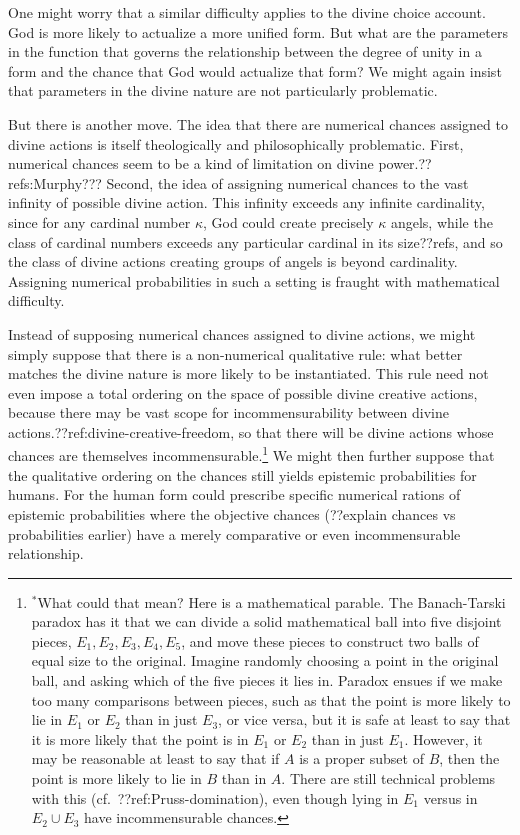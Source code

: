 One might worry that a similar difficulty applies to the divine choice account. God is more likely to actualize a more unified 
form. But what are the parameters in the function that governs the relationship between the degree of unity in a form and the chance that 
God would actualize that form? We might again insist that parameters in the divine nature are not particularly problematic.

But there is another move. The idea that there are numerical chances assigned to divine actions is itself theologically and philosophically
problematic. First, numerical chances seem to be a kind of limitation on divine power.??refs:Murphy??? Second, the idea of assigning 
numerical chances to the vast infinity of possible divine action. This infinity exceeds any infinite cardinality, since for any
cardinal number $\kappa$, God could create precisely $\kappa$ angels, while the class of cardinal numbers exceeds any particular cardinal 
in its size??refs, and so the class of divine actions creating groups of angels is beyond cardinality. Assigning numerical probabilities 
in such a setting is fraught with mathematical difficulty. 

Instead of supposing numerical chances assigned to divine actions, we might simply suppose that there is a non-numerical qualitative 
rule: what better matches the divine nature is more likely to be instantiated. This rule need not even impose a total ordering on the
space of possible divine creative actions, because there may be vast scope for incommensurability between divine actions.??ref:divine-creative-freedom,
so that there will be divine actions whose chances are themselves incommensurable.\footnote{$^*$What could that mean? Here is a mathematical
parable. The Banach-Tarski paradox has it that we can divide a solid mathematical ball into five disjoint pieces, $E_1,E_2,E_3,E_4,E_5$, and move these pieces to 
construct two balls of equal size to the original. Imagine randomly choosing a point in the original ball, and asking which of the
five pieces it lies in. Paradox ensues if we make too many comparisons between pieces, such as that the point is more likely to lie in 
$E_1$ or $E_2$ than in just $E_3$, or vice versa, but it is safe at least to say that it is more likely that the point is in $E_1$ or $E_2$
than in just $E_1$. However, it may be reasonable at least to say that if $A$ is a proper subset of $B$, then the point is more likely to lie in $B$ than
in $A$. There are still technical problems with this (cf.\ ??ref:Pruss-domination), even though lying in $E_1$ versus in $E_2\cup E_3$ have
incommensurable chances.} We might then further suppose that the qualitative ordering on the chances still yields epistemic probabilities for humans. For
the human form could prescribe specific numerical rations of epistemic probabilities where the objective chances (??explain chances vs probabilities earlier) 
have a merely comparative or even incommensurable relationship.

